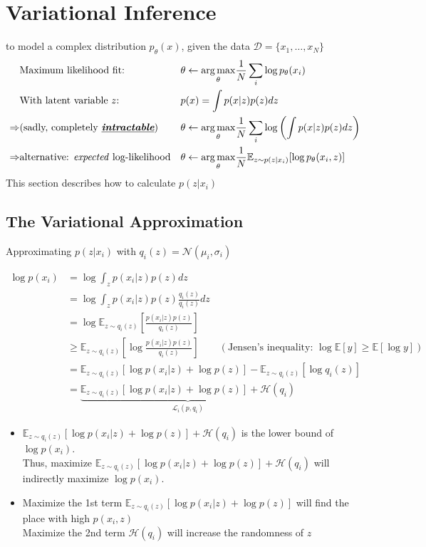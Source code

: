 \section{Variational Inference}
 to model a complex distribution $p_\theta(x)$, given the data $\mathcal{D} = \{ x_1, \dots, x_N \}$
\begin{align}
	&\text{Maximum likelihood fit:} && \theta \leftarrow \underset{\theta}{\arg\max} \frac{1}{N} \sum_i \log p_\theta(x_i)\\
	&\text{With latent variable $z$:} && p(x) = \int p(x|z) p(z) dz\\
	\Rightarrow &\text{(sadly, completely \textbf{\emph{\underline{intractable}}})} && \theta \leftarrow \underset{\theta}{\arg\max} \frac{1}{N} \sum_i \log \left( \int p(x|z) p(z) dz \right)\\
	\Rightarrow &\text{alternative: \textit{expected} log-likelihood} && \theta \leftarrow \underset{\theta}{\arg\max} \frac{1}{N} \mathbb{E}_{z\sim p(z|x_i)} [\log p_\theta (x_i, z)]
\end{align}
This section describes how to calculate $p(z|x_i)$

\subsection{The Variational Approximation}
 Approximating $p(z|x_i)$ with $q_i(z) = \mathcal{N}(\mu_i, \sigma_i)$

\begin{align}
	\log p(x_i) &= \log \int_z p(x_i|z) p(z) dz\\
	&= \log \int_z p(x_i|z) p(z) \frac{q_i(z)}{q_i(z)} dz\\
	&= \log \mathbb{E}_{z\sim q_i(z)} \left[ \frac{p(x_i|z) p(z)}{q_i(z)} \right]\\
	&\geq \mathbb{E}_{z\sim q_i(z)} \left[ \log \frac{p(x_i|z) p(z)}{q_i(z)} \right] \qquad(\text{Jensen's inequality: $\log \mathbb{E}[y] \geq \mathbb{E}[\log y]$})\\
	&= \mathbb{E}_{z\sim q_i(z)} [\log p(x_i|z) + \log p(z)] - \mathbb{E}_{z\sim q_i(z)}[\log q_i(z)]\\
	&= \underbrace{\mathbb{E}_{z\sim q_i(z)} [\log p(x_i|z) + \log p(z)] + \mathcal{H}(q_i)}_{\textstyle \mathcal{L}_i (p, q_i)}
\end{align}

\begin{itemize}
	\item $\mathbb{E}_{z\sim q_i(z)} [\log p(x_i|z) + \log p(z)] + \mathcal{H}(q_i)$ is the lower bound of $\log p(x_i)$.\\
	Thus, maximize $\mathbb{E}_{z\sim q_i(z)} [\log p(x_i|z) + \log p(z)] + \mathcal{H}(q_i)$ will indirectly maximize $\log p(x_i)$.
	\item Maximize the 1st term $\mathbb{E}_{z\sim q_i(z)} [\log p(x_i|z) + \log p(z)]$ will find the place with high $p(x_i, z)$\\
	Maximize the 2nd term $\mathcal{H}(q_i)$ will increase the randomness of $z$
\end{itemize}

